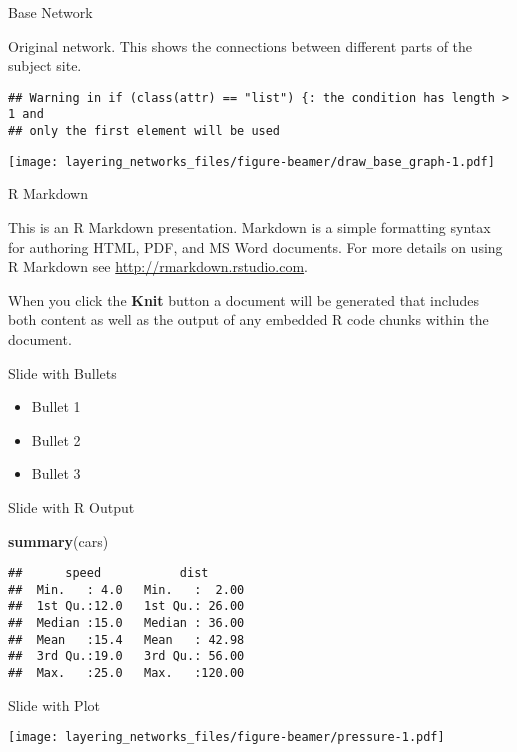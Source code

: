 \documentclass[
  ignorenonframetext,
]{beamer}
\newenvironment{Shaded}{\begin{snugshade}}{\end{snugshade}}
\newcommand{\KeywordTok}[1]{\textcolor[rgb]{0.13,0.29,0.53}{\textbf{#1}}}
\newcommand{\NormalTok}[1]{#1}
\providecommand{\tightlist}{%
  \setlength{\itemsep}{0pt}\setlength{\parskip}{0pt}}
\begin{document}
\begin{frame}[fragile]{Base Network}
\protect\hypertarget{base-network}{}

Original network. This shows the connections between different parts of
the subject site.

\begin{verbatim}
## Warning in if (class(attr) == "list") {: the condition has length > 1 and
## only the first element will be used
\end{verbatim}

\texttt{[image: layering\_networks\_files/figure-beamer/draw\_base\_graph-1.pdf]}

\end{frame}

\begin{frame}{R Markdown}
\protect\hypertarget{r-markdown}{}

This is an R Markdown presentation. Markdown is a simple formatting
syntax for authoring HTML, PDF, and MS Word documents. For more details
on using R Markdown see \url{http://rmarkdown.rstudio.com}.

When you click the \textbf{Knit} button a document will be generated
that includes both content as well as the output of any embedded R code
chunks within the document.

\end{frame}

\begin{frame}{Slide with Bullets}
\protect\hypertarget{slide-with-bullets}{}

\begin{itemize}
\tightlist
\item
  Bullet 1
\item
  Bullet 2
\item
  Bullet 3
\end{itemize}

\end{frame}

\begin{frame}[fragile]{Slide with R Output}
\protect\hypertarget{slide-with-r-output}{}

\begin{Shaded}
\begin{Highlighting}[]
\KeywordTok{summary}\NormalTok{(cars)}
\end{Highlighting}
\end{Shaded}

\begin{verbatim}
##      speed           dist       
##  Min.   : 4.0   Min.   :  2.00  
##  1st Qu.:12.0   1st Qu.: 26.00  
##  Median :15.0   Median : 36.00  
##  Mean   :15.4   Mean   : 42.98  
##  3rd Qu.:19.0   3rd Qu.: 56.00  
##  Max.   :25.0   Max.   :120.00
\end{verbatim}

\end{frame}

\begin{frame}{Slide with Plot}
\protect\hypertarget{slide-with-plot}{}

\texttt{[image: layering\_networks\_files/figure-beamer/pressure-1.pdf]}

\end{frame}
\end{document}
